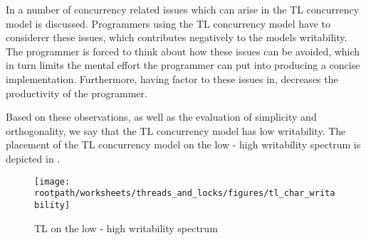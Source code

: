 In  a number of concurrency related issues which can arise in the \ac{TL} concurrency model is discussed. Programmers using the \ac{TL} concurrency model have to considerer these issues, which contributes negatively to the models writability. The programmer is forced to think about how these issues can be avoided, which in turn limits the mental effort the programmer can put into producing a concise implementation. Furthermore, having factor to these issues in, decreases the productivity of the programmer.

Based on these observations, as well as the evaluation of simplicity and orthogonality, we say that the \ac{TL} concurrency model has low writability. The placement of the \ac{TL} concurrency model on the low - high writability spectrum is depicted in .

\begin{figure}[htbp]
\centering
 \texttt{[image: \\rootpath/worksheets/threads\_and\_locks/figures/tl\_char\_writability]} 
 \caption{\ac{TL} on the low - high writability spectrum}
\label{fig:char_tl_writability}
\end{figure}

\worksheetend
